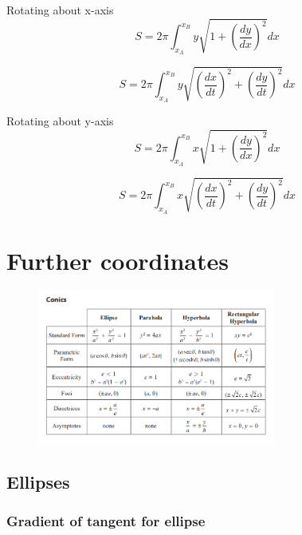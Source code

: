 \documentclass[a4paper,9pt]{scrartcl}
\begin{document}
    Rotating about x-axis
    \begin{displaymath}
        S = 2{\pi}\int_{x_A}^{x_B} y{\sqrt{1+\left( \frac{dy}{dx} \right)^2}}dx
    \end{displaymath}

    \begin{displaymath}
        S = 2{\pi}\int_{x_A}^{x_B} y{\sqrt{\left( \frac{dx}{dt} \right)^2 + \left( \frac{dy}{dt} \right)^2}}dx
    \end{displaymath}


    Rotating about y-axis
    \begin{displaymath}
        S = 2{\pi}\int_{x_A}^{x_B} x{\sqrt{1+\left( \frac{dy}{dx} \right)^2}}dx
    \end{displaymath}

    \begin{displaymath}
        S = 2{\pi}\int_{x_A}^{x_B} x{\sqrt{\left( \frac{dx}{dt} \right)^2 + \left( \frac{dy}{dt} \right)^2}}dx
    \end{displaymath}


    \section{Further coordinates}

    \begin{figure}[!htb]
        \centering
        \includegraphics[width=0.7\textwidth]{Conics.png}
    \end{figure}

    \subsection{Ellipses}

    \subsubsection{Gradient of tangent for ellipse}
\end{document}
